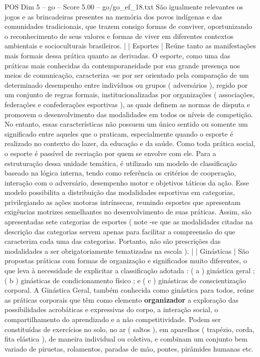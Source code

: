 \begin{textsample}{POS Dim 5 – go – Score 5.00 – go/go\_ef\_18.txt}
São igualmente relevantes os jogos e as brincadeiras presentes na memória dos povos indígenas e das comunidades tradicionais, que trazem consigo formas de conviver, oportunizando o reconhecimento de seus valores e formas de viver em diferentes contextos ambientais e socioculturais brasileiros. | | Esportes | Reúne tanto as manifestações mais formais dessa prática quanto as derivadas.
O esporte, como uma das práticas mais conhecidas da contemporaneidade por sua grande presença nos meios de comunicação, caracteriza -se por ser orientado pela comparação de um determinado desempenho entre indivíduos ou grupos ( adversários ), regido por um conjunto de regras formais, institucionalizadas por organizações ( associações, federações e confederações esportivas ), as quais definem as normas de disputa e promovem o desenvolvimento das modalidades em todos os níveis de competição.
No entanto, essas características não possuem um único sentido ou somente um significado entre aqueles que o praticam, especialmente quando o esporte é realizado no contexto do lazer, da educação e da saúde.
Como toda prática social, o esporte é passível de recriação por quem se envolve com ele.
Para a estruturação dessa unidade temática, é utilizado um modelo de classificação baseado na lógica interna, tendo como referência os critérios de cooperação, interação com o adversário, desempenho motor e objetivos táticos da ação.
Esse modelo possibilita a distribuição das modalidades esportivas em categorias, privilegiando as ações motoras intrínsecas, reunindo esportes que apresentam exigências motrizes semelhantes no desenvolvimento de suas práticas.
Assim, são apresentadas sete categorias de esportes ( note -se que as modalidades citadas na descrição das categorias servem apenas para facilitar a compreensão do que caracteriza cada uma das categorias.
Portanto, não são prescrições das modalidades a ser obrigatoriamente tematizadas na escola ). | | Ginásticas | São propostas práticas com formas de organização e significados muito diferentes, o que leva à necessidade de explicitar a classificação adotada : ( a ) ginástica geral ; ( b ) ginásticas de condicionamento físico ; e ( c ) ginásticas de conscientização corporal.
A Ginástica Geral, também conhecida como ginástica para todos, reúne as práticas corporais que têm como elemento \textbf{organizador} a exploração das possibilidades acrobáticas e expressivas do corpo, a interação social, o compartilhamento do aprendizado e a não competitividade.
Podem ser constituídas de exercícios no solo, no ar ( saltos ), em aparelhos ( trapézio, corda, fita elástica ), de maneira individual ou coletiva, e combinam um conjunto bem variado de piruetas, rolamentos, paradas de mão, pontes, pirâmides humanas etc.

\end{textsample}

